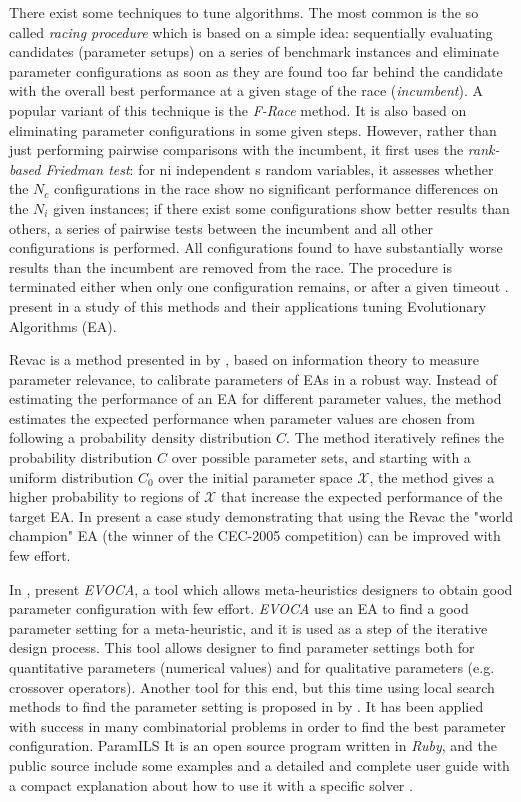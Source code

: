 There exist some techniques to tune algorithms. The most common is the so called {\it racing procedure} which is based on a simple idea: sequentially evaluating candidates (parameter setups) on a series of benchmark instances and eliminate parameter configurations as soon as they are found too far behind the candidate with the overall best performance at a given stage of the race (\textit{incumbent}). A popular variant of this technique is the \textit{F-Race} method. It is also based on eliminating parameter configurations in some given steps. However, rather than just performing pairwise comparisons with the incumbent, it first uses the \textit{rank-based Friedman test}: for ni independent s random variables,
it assesses whether the $N_c$ configurations in the race show no significant performance differences on the $N_i$ given instances; if there exist some configurations show better results than others, a series of pairwise tests between the incumbent and all other configurations is performed. All configurations found to have substantially worse results than the incumbent are removed from the race. The procedure is terminated either when only one configuration remains, or after a given timeout \cite{Hoos2012}.  present in \cite{A.E.Eiben2012} a study of this methods and their applications tuning Evolutionary Algorithms (EA).

{\sc Revac} is a method presented in \cite{Nannen2007} by , based on information theory to measure parameter relevance, to calibrate parameters of EAs in a robust way. Instead of estimating the performance of an EA for different parameter values, the method estimates the expected performance when parameter values are chosen from following a probability density distribution $C$. The method iteratively refines the probability distribution $C$ over possible parameter sets, and starting with a uniform distribution $C_0$ over the initial parameter space $\mathcal{X}$, the method gives a higher probability to regions of $\mathcal{X}$ that increase the expected performance of the target EA. In \cite{Smit2010}  present a case study demonstrating that using the {\sc Revac} the "world champion" EA (the winner of the CEC-2005 competition) can be improved with few effort.

In \cite{Riff2013},  present \textit{EVOCA}, a tool which allows meta-heuristics designers to obtain good parameter configuration with few effort. \textit{EVOCA} use an EA to find a good parameter setting for a meta-heuristic, and it is used as a step of the iterative design process. This tool allows designer to find parameter settings both for quantitative parameters (numerical values) and for qualitative parameters (e.g. crossover operators). Another tool for this end, but this time using local search methods to find the parameter setting is  proposed in \cite{Hutter2009} by . It has been applied with success in many combinatorial problems in order to find the best parameter configuration. {\sc ParamILS} It is an open source program written in {\it Ruby}, and the public source include some examples and a detailed and complete user guide with a compact explanation about how to use it with a specific solver \cite{Hutter2008}.

